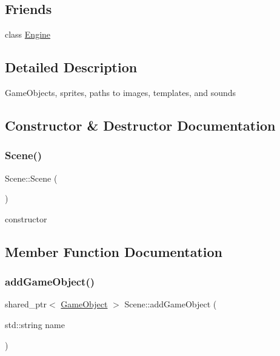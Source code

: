 \subsection*{Friends}
\begin{DoxyCompactItemize}
\item 
class \hyperlink{class_mason_1_1_scene_a3e1914489e4bed4f9f23cdeab34a43dc}{Engine}
\end{DoxyCompactItemize}


\subsection{Detailed Description}
Game\+Objects, sprites, paths to images, templates, and sounds 

\subsection{Constructor \& Destructor Documentation}
\hypertarget{class_mason_1_1_scene_ad10176d75a9cc0da56626f682d083507}{}\label{class_mason_1_1_scene_ad10176d75a9cc0da56626f682d083507} 
\subsubsection{\texorpdfstring{Scene()}{Scene()}}
{\footnotesize\ttfamily Scene\+::\+Scene (\begin{DoxyParamCaption}{ }\end{DoxyParamCaption})}



constructor 



\subsection{Member Function Documentation}
\hypertarget{class_mason_1_1_scene_afe8ac9cb371c04a0587faf06bf828ac9}{}\label{class_mason_1_1_scene_afe8ac9cb371c04a0587faf06bf828ac9} 
\subsubsection{\texorpdfstring{add\+Game\+Object()}{addGameObject()}}
{\footnotesize\ttfamily shared\+\_\+ptr$<$ \hyperlink{class_mason_1_1_game_object}{Game\+Object} $>$ Scene\+::add\+Game\+Object (\begin{DoxyParamCaption}\item[{std\+::string}]{name }\end{DoxyParamCaption})}



